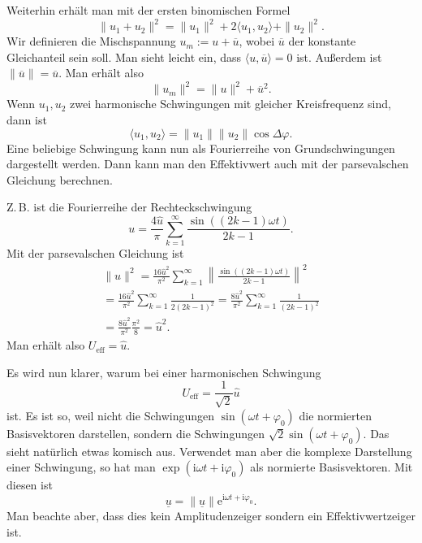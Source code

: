 \documentclass[a4paper,11pt,fleqn,twocolumn,twoside]{scrartcl}
\numberwithin{equation}{section}
\newcommand{\ui}{\mathrm i}
\newcommand{\ee}{\mathrm e}
\begin{document}
Weiterhin erhält man mit der ersten binomischen Formel
\begin{equation}
\|u_1+u_2\|^2 = \|u_1\|^2+2\langle u_1,u_2\rangle+\|u_2\|^2.
\end{equation}
Wir definieren die Mischspannung $u_m := u+\overline u$,
wobei $\overline u$ der konstante Gleichanteil sein soll. Man sieht
leicht ein, dass $\langle u,\overline u\rangle=0$ ist.
Außerdem ist $\|\overline u\|=\overline u$. Man erhält also
\begin{equation}
\|u_m\|^2 = \|u\|^2+\overline u^2.
\end{equation}
Wenn $u_1,u_2$ zwei harmonische Schwingungen mit gleicher
Kreisfrequenz sind, dann ist
\begin{equation}
\langle u_1,u_2\rangle = \|u_1\|\|u_2\|\cos\Delta\varphi.
\end{equation}
Eine beliebige Schwingung kann nun als Fourierreihe von
Grundschwingungen dargestellt werden. Dann kann man den Effektivwert
auch mit der parsevalschen Gleichung berechnen.

Z.\,B. ist die Fourierreihe der Rechteckschwingung
\begin{equation}
u = \frac{4\hat u}{\pi} \sum_{k=1}^{\infty}
\frac{\sin((2k-1)\omega t)}{2k-1}.
\end{equation}
Mit der parsevalschen Gleichung ist
\begin{gather*}
\|u\|^2 = \frac{16\hat u^2}{\pi^2} \sum_{k=1}^{\infty}
\left\|\frac{\sin((2k-1)\omega t)}{2k-1}\right\|^2\\
= \frac{16\hat u^2}{\pi^2} \sum_{k=1}^{\infty} \frac{1}{2(2k-1)^2}
= \frac{8\hat u^2}{\pi^2} \sum_{k=1}^{\infty} \frac{1}{(2k-1)^2}\\
= \frac{8\hat u^2}{\pi^2} \frac{\pi^2}{8} = \hat u^2.
\end{gather*}
Man erhält also $U_\mathrm{eff}=\hat u$.

Es wird nun klarer, warum bei einer harmonischen Schwingung
\begin{equation}
U_\mathrm{eff}=\frac{1}{\sqrt{2}}\hat u
\end{equation}
ist. Es ist so, weil nicht die Schwingungen
$\sin(\omega t+\varphi_0)$ die normierten Basisvektoren darstellen,
sondern die Schwingungen $\sqrt{2}\sin(\omega t+\varphi_0)$. Das
sieht natürlich etwas komisch aus. Verwendet man aber die komplexe
Darstellung einer Schwingung, so hat man
$\exp(\ui\omega t+\ui\varphi_0)$ als normierte Basisvektoren.
Mit diesen ist
\begin{equation}
\underline u = \|\underline u\|\ee^{\ui\omega t+\ui\varphi_0}.
\end{equation}
Man beachte aber, dass dies kein Amplitudenzeiger sondern ein
Effektivwertzeiger ist.
\end{document}
